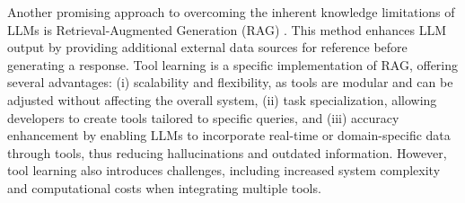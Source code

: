 \documentclass[runningheads]{llncs}
\begin{document}
Another promising approach to overcoming the inherent knowledge limitations of LLMs is Retrieval-Augmented Generation (RAG) \cite{10.1145/3637528.3671470}. This method enhances LLM output by providing additional external data sources for reference before generating a response. Tool learning \cite{Qu2024ToolLW,10.1145/3626772.3661381} is a specific implementation of RAG, offering several advantages: (i) scalability and flexibility, as tools are modular and can be adjusted without affecting the overall system, (ii) task specialization, allowing developers to create tools tailored to specific queries, and (iii) accuracy enhancement  by enabling LLMs to incorporate real-time or domain-specific data through tools, thus reducing hallucinations and outdated information. However, tool learning also introduces challenges, including increased system complexity and computational costs when integrating multiple tools.




\end{document}
